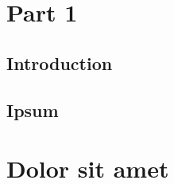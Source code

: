 \usepackage{lipsum}




\coverpage{\TITLE}{\SUBTITLE}{\AUTHOR}{\DATE}{\SUBJECT}
\newpage
\backgroundbarvisiblefalse
\pagestyle{plain}




\newpage
\tableofcontents

\part{Part 1}
\newpage
\chapter{Introduction} \label{ch:introduction}

\newpage
\chapter{Ipsum}\label{ch:ipsum}


\part{Dolor sit amet}
\newpage
